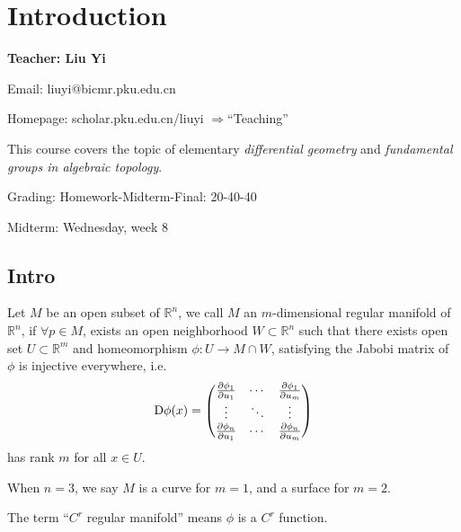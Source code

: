 \section{Introduction}
\label{sec:Introduction}
\begin{center}
	\sffamily\large\bfseries Teacher: Liu Yi

	Email: liuyi@bicmr.pku.edu.cn

	Homepage: scholar.pku.edu.cn/liuyi $\Rightarrow$``Teaching''
\end{center}

This course covers the topic of elementary \textit{differential geometry}
and \textit{fundamental groups in algebraic topology}.

Grading: Homework-Midterm-Final: 20-40-40

Midterm: Wednesday, week 8

\subsection{Intro}
\label{sub:Intro}
\begin{definition}[Manifold]
	Let $M$ be an open subset of $\mathbb{R}^n$, we call $M$ an $m$-dimensional regular
	manifold of $\mathbb{R}^n$, if $\forall p\in M$, exists an open neighborhood
	$W \subset \mathbb{R}^n$ such that there exists open set $U \subset \mathbb{R}^m$
	and homeomorphism $\phi: U\to M \cap W$, satisfying the Jabobi matrix of $\phi$
	is injective everywhere, i.e.
	\[
	\mathop{}\!\mathrm{D}\phi(x) = \begin{pmatrix}
		\frac{\partial\phi_1}{\partial u_1} &\cdots &\frac{\partial\phi_1}{\partial u_m}\\
		\vdots &\ddots &\vdots \\
		\frac{\partial\phi_n}{\partial u_1} &\cdots &\frac{\partial\phi_n}{\partial u_m}
	\end{pmatrix}
	\]
	has rank $m$ for all  $x\in U$.
\end{definition}
When $n=3$, we say $M$ is a curve for $m=1$, and a surface for $m=2$.
\begin{remark}
    The term ``$C^r$ regular manifold'' means $\phi$ is a  $C^r$ function.
\end{remark}

